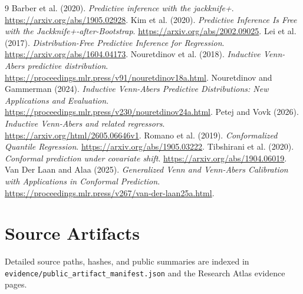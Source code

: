 \documentclass[11pt]{article}
\begin{document}
\begin{thebibliography}{9}
 Barber et al. (2020). \emph{Predictive inference with the jackknife+}. \url{https://arxiv.org/abs/1905.02928}.
 Kim et al. (2020). \emph{Predictive Inference Is Free with the Jackknife+-after-Bootstrap}. \url{https://arxiv.org/abs/2002.09025}.
 Lei et al. (2017). \emph{Distribution-Free Predictive Inference for Regression}. \url{https://arxiv.org/abs/1604.04173}.
 Nouretdinov et al. (2018). \emph{Inductive Venn-Abers predictive distribution}. \url{https://proceedings.mlr.press/v91/nouretdinov18a.html}.
 Nouretdinov and Gammerman (2024). \emph{Inductive Venn-Abers Predictive Distributions: New Applications and Evaluation}. \url{https://proceedings.mlr.press/v230/nouretdinov24a.html}.
 Petej and Vovk (2026). \emph{Inductive Venn-Abers and related regressors}. \url{https://arxiv.org/html/2605.06646v1}.
 Romano et al. (2019). \emph{Conformalized Quantile Regression}. \url{https://arxiv.org/abs/1905.03222}.
 Tibshirani et al. (2020). \emph{Conformal prediction under covariate shift}. \url{https://arxiv.org/abs/1904.06019}.
 Van Der Laan and Alaa (2025). \emph{Generalized Venn and Venn-Abers Calibration with Applications in Conformal Prediction}. \url{https://proceedings.mlr.press/v267/van-der-laan25a.html}.
\end{thebibliography}

\section{Source Artifacts}

Detailed source paths, hashes, and public summaries are indexed in \texttt{evidence/\allowbreak{}public\_\allowbreak{}artifact\_\allowbreak{}manifest.\allowbreak{}json} and the Research Atlas evidence pages.
\end{document}

